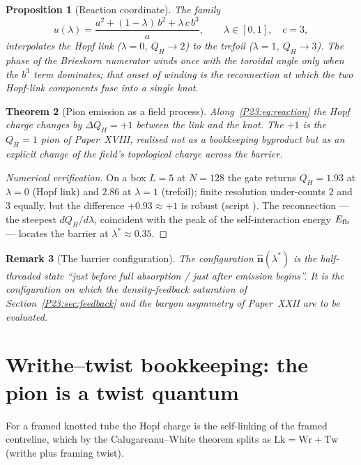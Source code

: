 \documentclass[11pt,a4paper]{article}
\newtheorem{theorem}{Theorem}[section]
\newtheorem{proposition}[theorem]{Proposition}
\newtheorem{remark}[theorem]{Remark}
\theoremstyle{definition}\newtheorem{definition}[theorem]{Definition}
\newcommand{\QH}{Q_H}
\newcommand{\Wr}{\mathrm{Wr}}
\newcommand{\Tw}{\mathrm{Tw}}
\newcommand{\Lk}{\mathrm{Lk}}
\newcommand{\nhat}{\hat{\mathbf{n}}}
\begin{document}
\begin{proposition}[Reaction coordinate]
\label{P23:prop:reaction}
The family
\begin{equation}
  u(\lambda)=\frac{a^2+(1-\lambda)\,b^2+\lambda\,c\,b^3}{a},\qquad\lambda\in[0,1],\quad c=3,
  \label{P23:eq:reaction}
\end{equation}
interpolates the Hopf link ($\lambda=0$, $\QH\to2$) to the trefoil ($\lambda=1$, $\QH\to3$). The
phase of the Brieskorn numerator winds once with the toroidal angle only when the $b^3$ term
dominates; that onset of winding is the reconnection at which the two Hopf-link components fuse
into a single knot.
\end{proposition}

\begin{theorem}[Pion emission as a field process]
\label{P23:thm:pion}
Along~\eqref{P23:eq:reaction} the Hopf charge changes by $\Delta\QH=+1$ between the link and the
knot. The $+1$ is the $\QH=1$ pion of Paper~XVIII, realised not as a bookkeeping byproduct but as
an explicit change of the field's topological charge across the barrier.
\end{theorem}

\begin{proof}[Numerical verification]
On a box $L=5$ at $N=128$ the gate returns $\QH=1.93$ at $\lambda=0$ (Hopf link) and $2.86$ at
$\lambda=1$ (trefoil); finite resolution under-counts $2$ and $3$ equally, but the difference
$+0.93\approx+1$ is robust (script ). The reconnection --- the steepest
$d\QH/d\lambda$, coincident with the peak of the self-interaction energy $E_{\rm fb}$ --- locates
the barrier at $\lambda^\ast\approx0.35$.
\end{proof}

\begin{remark}[The barrier configuration]
\label{P23:rem:barrier}
The configuration $\nhat(\lambda^\ast)$ is the half-threaded state ``just before full absorption /
just after emission begins''. It is the configuration on which the density-feedback saturation of
Section~\ref{P23:sec:feedback} and the baryon asymmetry of Paper~XXII are to be evaluated.
\end{remark}

\section{Writhe--twist bookkeeping: the pion is a twist quantum}
\label{P23:sec:writhetwist}
For a framed knotted tube the Hopf charge is the self-linking of the framed centreline, which by
the Calugareanu--White theorem splits as $\Lk=\Wr+\Tw$ (writhe plus framing twist).
\end{document}
